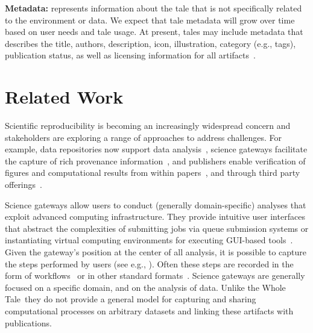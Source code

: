 \documentclass{elsarticle}
\newcommand{\wt}{Whole\,Tale}
\begin{document}
\textbf{Metadata:} represents information about the tale that is
not specifically related to the environment or data. We expect
that tale metadata will grow over time based on user needs and 
tale usage.  At present, tales may include metadata that describes
the title, authors, description, icon, illustration, category (e.g., tags), publication status, as well as licensing information for all artifacts~\cite{stodden_legal_2009}.


 
 
 
\section{Related Work}\label{sec:relatedwork}

Scientific reproducibility is becoming an increasingly widespread
concern and stakeholders are exploring a range of 
approaches to address challenges. For example, 
data repositories now support data analysis~\cite{SciServer,TerraRef}, 
science gateways facilitate the capture of rich provenance
information~\cite{gesing15gateways},
and publishers enable verification of figures and computational 
results from within papers~\cite{shen14notebooks}, and through third party offerings~\cite{5872076, 10.1109/ICCV.2013.101}. 

Science gateways allow users to conduct (generally domain-specific) analyses that exploit
advanced computing infrastructure. They provide intuitive user interfaces that abstract
the complexities of submitting jobs via queue submission systems or
instantiating virtual computing environments for executing GUI-based tools~\cite{mclennan10hub}. Given the gateway's position at the
center of all analysis, it is possible
to capture the steps performed by users (see e.g., \cite{DBLP:journals/corr/JamesWS14}). Often these steps
are recorded in the form of workflows~\cite{goecks10galaxy}
or in other standard formats~\cite{prov-dm}.
Science gateways are generally focused on a specific domain, and 
on the analysis of data. Unlike the \wt\ they do
not provide a general model for capturing and sharing computational processes 
on arbitrary datasets and linking these artifacts with publications.
\end{document}
